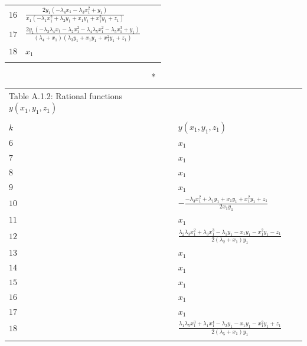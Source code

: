 \documentclass[10pt]{article}
\begin{document}
{\begin{longtable}{llll}
\\
 \vspace{1mm}$16$ &
  $\frac{2 y_1 (-\lambda_4 x_1 - \lambda_3 x_1^2 + y_1)}{x_1 (-\lambda_1 x_1^2 + \lambda_2 y_1 + x_1 y_1 + 
   x_1^2 y_1 + z_1)}$ 
   \\
  \vspace{1mm}$17$ &
   $\frac{2 y_1 (-\lambda_2 \lambda_4 x_1 - \lambda_2 x_1^2 - \lambda_4 \lambda_5 x_1^2 - \lambda_5 x_1^3 + y_1)}{(\lambda_4 + 
   x_1) (\lambda_3 y_1 + x_1 y_1 + x_1^2 y_1 + z_1)}$ 
   \\
 \vspace{1mm}   $18$ &  $x_1$ 
 \\
 \hline\\
\end{longtable} 
}
\vspace{-3mm}
{\small
\begin{longtable}{llll}
\caption*{Table A.1.2: Rational functions  $ y(x_1,y_1,z_1)$ }
\vspace{-5.5mm}\\
\\
\hline
  $k$ &  $y(x_1,y_1,z_1)$     
    \\
  \hline
  \endhead
\vspace{1mm}$6$ 
& $x_1$ 
  \\
\vspace{1mm}$7$ 
& $x_1$ 
 \\
\vspace{1mm}$8$ &
  $x_1$ 
  \\
\vspace{1mm}$9$ &
  $x_1$ 
  \\
\vspace{1mm}$10$ &
  $-\frac{-\lambda_3 x_1^2  + \lambda_1 y_1 + x_1 y_1 + x_1^2 y_1+z_1}{2 x_1 y_1}$
   \\
\vspace{1mm}$11$ &
  $x_1$ 
  \\
\vspace{1mm}$12$ & 
 $\frac{\lambda_2 \lambda_3 x_1^2 + \lambda_3 x_1^3 - \lambda_1 y_1 - x_1 y_1 - x_1^2 y_1 - z_1}{2 (\lambda_2 + x_1) y_1}$ 
 \\
\vspace{1mm}$13$ & 
 $x_1$
 \\
\vspace{1mm}$14$ &
      $x_1$ 
      \\
\vspace{1mm}$15$ &
  $x_1$
   \\
 \vspace{1mm}$16$ & 
    $x_1$
    \\
  \vspace{1mm}$17$ & 
   $x_1$ 
  \\
 \vspace{1mm}   $18$ & 
  $\frac{\lambda_1 \lambda_5 x_1^3 + \lambda_1 x_1^4 - \lambda_2 y_1 - x_1 y_1 - x_1^2 y_1 + z_1}{2 (\lambda_5 + x_1) y_1}$ 
  \\
 \hline\\
\end{longtable} 
}
\end{document}
